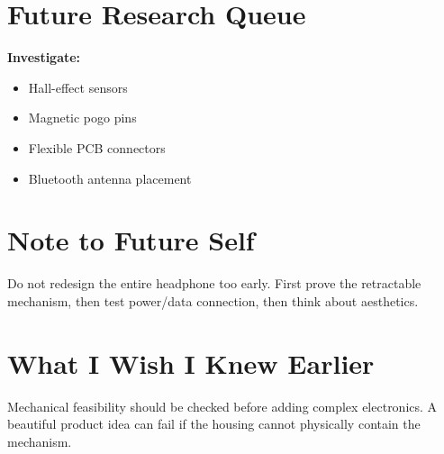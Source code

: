 \documentclass{otengineering}
\begin{document}
\section{Future Research Queue}

\begin{researchqueue}
    \textbf{Investigate:}
    \begin{itemize}
        \item Hall-effect sensors
        \item Magnetic pogo pins
        \item Flexible PCB connectors
        \item Bluetooth antenna placement
    \end{itemize}
\end{researchqueue}

\section{Note to Future Self}

\begin{futurememo}
    Do not redesign the entire headphone too early. First prove the retractable mechanism,
    then test power/data connection, then think about aesthetics.
\end{futurememo}

\section{What I Wish I Knew Earlier}

\begin{wisdom}
    Mechanical feasibility should be checked before adding complex electronics.
    A beautiful product idea can fail if the housing cannot physically contain the mechanism.
\end{wisdom}
\end{document}
